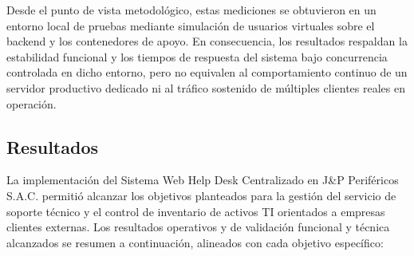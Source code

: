 Desde el punto de vista metodológico, estas mediciones se obtuvieron en un entorno local de pruebas mediante simulación de usuarios virtuales sobre el backend y los contenedores de apoyo. En consecuencia, los resultados respaldan la estabilidad funcional y los tiempos de respuesta del sistema bajo concurrencia controlada en dicho entorno, pero no equivalen al comportamiento continuo de un servidor productivo dedicado ni al tráfico sostenido de múltiples clientes reales en operación.

\subsection{Resultados}

La implementación del Sistema Web Help Desk Centralizado en J\&P Periféricos S.A.C. permitió alcanzar los objetivos planteados para la gestión del servicio de soporte técnico y el control de inventario de activos TI orientados a empresas clientes externas. Los resultados operativos y de validación funcional y técnica alcanzados se resumen a continuación, alineados con cada objetivo específico:

